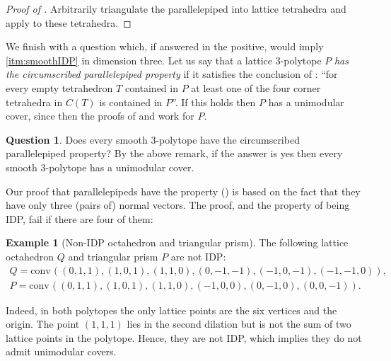 \documentclass{amsart}
\theoremstyle{plain}
\theoremstyle{definition}
\newtheorem{example}[theorem]{Example}
\newtheorem{question}[theorem]{Question}
\newtheorem{remark}[theorem]{Remark}
\newcommand{\R}{ \ensuremath{\mathbb{R}}}
\newcommand{\conv}{\ensuremath{\mathrm{conv}}\hspace{1pt}}
\newcommand{\giulia}[1]{\todo[size=\tiny,color=blue!30]{#1 \\ \hfill --- G.}}
\begin{document}
\begin{proof}[Proof of ]\giulia{see comment above}
Arbitrarily triangulate the parallelepiped into lattice tetrahedra and apply  to these tetrahedra.
%
%
\end{proof}




We finish with a question which, if answered in the positive, would imply \eqref{itm:smoothIDP} in dimension three.
Let us say that a lattice $3$-polytope $P$ \emph{has the circumscribed parallelepiped property} if it satisfies the conclusion of :  ``for every empty tetrahedron $T$ contained in $P$ at least one of the four corner tetrahedra in $C(T)$ is 
contained in $P$''. 
If this holds then $P$ has a unimodular cover, since then the proofs of  and  work for $P$.

\begin{question}
Does every smooth 3-polytope have the circumscribed parallelepiped property? By the above remark, if the answer is yes then every smooth $3$-polytope has a unimodular cover.
\end{question}

Our proof that parallelepipeds have the property () is based on the fact that they have only three (pairs of) normal vectors. The proof, and the property of being IDP, fail if there are four of them:

\begin{example}[Non-IDP octahedron and triangular prism]
\label{ex:non-IDP}
The following lattice octahedron $Q$ and triangular prism $P$ are not IDP:
\begin{gather}
Q= \conv((0,1,1),(1,0,1),(1,1,0),(0,-1,-1),(-1,0,-1),(-1,-1,0)),\\
P=\conv((0,1,1),(1,0,1),(1,1,0),(-1,0,0),(0,-1,0),(0,0,-1)).
\end{gather}

Indeed, in both polytopes the only lattice points are the six vertices and the origin. The point $(1,1,1)$ lies in the second dilation but is not the sum of two lattice points in the polytope. Hence, they are not IDP, which implies they do not admit unimodular covers.
\end{example}
\end{document}
